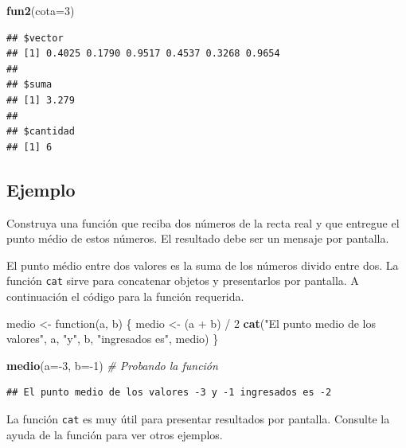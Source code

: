 \documentclass[10pt,]{krantz}
\makeatletter
\newenvironment{Shaded}{\begin{snugshade}}{\end{snugshade}}
\newcommand{\KeywordTok}[1]{\textcolor[rgb]{0.13,0.29,0.53}{\textbf{{#1}}}}
\newcommand{\DataTypeTok}[1]{\textcolor[rgb]{0.13,0.29,0.53}{{#1}}}
\newcommand{\DecValTok}[1]{\textcolor[rgb]{0.00,0.00,0.81}{{#1}}}
\newcommand{\StringTok}[1]{\textcolor[rgb]{0.31,0.60,0.02}{{#1}}}
\newcommand{\CommentTok}[1]{\textcolor[rgb]{0.56,0.35,0.01}{\textit{{#1}}}}
\newcommand{\NormalTok}[1]{{#1}}
\newenvironment{kframe}{%
\medskip{}
\setlength{\fboxsep}{.8em}
 \def\at@end@of@kframe{}%
 \ifinner\ifhmode%
  \def\at@end@of@kframe{\end{minipage}}%
  \begin{minipage}{\columnwidth}%
 \fi\fi%
 \def\FrameCommand##1{\hskip\@totalleftmargin \hskip-\fboxsep
 \colorbox{shadecolor}{##1}\hskip-\fboxsep
     \hskip-\linewidth \hskip-\@totalleftmargin \hskip\columnwidth}%
 \MakeFramed {\advance\hsize-\width
   \@totalleftmargin\z@ \linewidth\hsize
   \@setminipage}}%
 {\par\unskip\endMakeFramed%
 \at@end@of@kframe}
\renewenvironment{Shaded}{\begin{kframe}}{\end{kframe}}
\let\BeginKnitrBlock\begin \let\EndKnitrBlock\end
\makeatother
\begin{document}
\begin{Shaded}
\begin{Highlighting}[]
\KeywordTok{fun2}\NormalTok{(}\DataTypeTok{cota=}\DecValTok{3}\NormalTok{)}
\end{Highlighting}
\end{Shaded}

\begin{verbatim}
## $vector
## [1] 0.4025 0.1790 0.9517 0.4537 0.3268 0.9654
## 
## $suma
## [1] 3.279
## 
## $cantidad
## [1] 6
\end{verbatim}

\subsection*{Ejemplo}\label{ejemplo-11}


Construya una función que reciba dos números de la recta real y que
entregue el punto médio de estos números. El resultado debe ser un
mensaje por pantalla.

El punto médio entre dos valores es la suma de los números divido entre
dos. La función \texttt{cat} sirve para concatenar objetos y
presentarlos por pantalla. A continuación el código para la función
requerida.

\begin{Shaded}
\begin{Highlighting}[]
\NormalTok{medio <-}\StringTok{ }\NormalTok{function(a, b) \{}
  \NormalTok{medio <-}\StringTok{ }\NormalTok{(a +}\StringTok{ }\NormalTok{b) /}\StringTok{ }\DecValTok{2}
  \KeywordTok{cat}\NormalTok{(}\StringTok{"El punto medio de los valores"}\NormalTok{,}
      \NormalTok{a, }\StringTok{"y"}\NormalTok{, b,}
      \StringTok{"ingresados es"}\NormalTok{, medio)}
\NormalTok{\}}

\KeywordTok{medio}\NormalTok{(}\DataTypeTok{a=}\NormalTok{-}\DecValTok{3}\NormalTok{, }\DataTypeTok{b=}\NormalTok{-}\DecValTok{1}\NormalTok{)  }\CommentTok{# Probando la función}
\end{Highlighting}
\end{Shaded}

\begin{verbatim}
## El punto medio de los valores -3 y -1 ingresados es -2
\end{verbatim}

\BeginKnitrBlock{rmdnote}
La función \texttt{cat} es muy útil para presentar resultados por
pantalla. Consulte la ayuda de la función para ver otros ejemplos.
\EndKnitrBlock{rmdnote}
\end{document}
